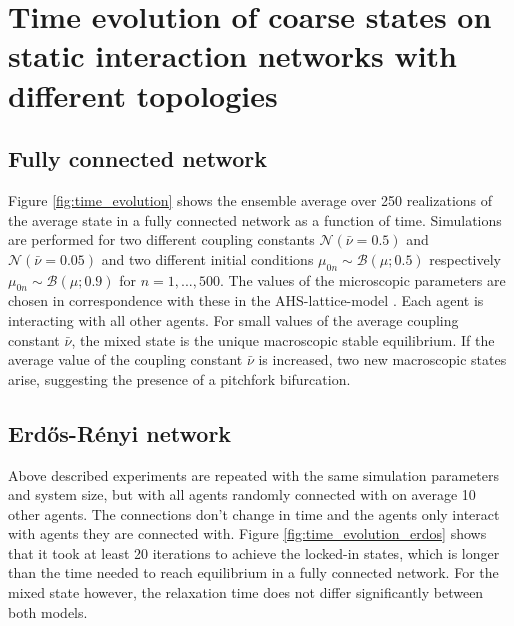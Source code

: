 \documentclass[]{article}
\title{}
\author{}
\begin{document}

\section{Time evolution of coarse states on static interaction networks with different topologies}
\subsection{Fully connected network}

Figure \ref{fig:time_evolution} shows the ensemble average over 250 realizations of the average state in a fully connected network as a function of time. Simulations are performed for two different coupling constants $\mathcal{N}(\bar{\nu}=0.5)$ and  $\mathcal{N}(\bar{\nu}=0.05)$ and two different initial conditions $ \mu_{0 n} \sim \mathcal{B} ( \mu; 0.5) $ respectively $ \mu_{0n} \sim\mathcal{B} ( \mu; 0.9 ) $ for $n=1,...,500$.     %
 The values of the microscopic parameters are chosen in correspondence with these in the AHS-lattice-model \cite{avitabile14}. Each agent is interacting with all other agents. For small values of the average coupling constant $\bar{\nu}$, the mixed state is the unique macroscopic stable equilibrium.  If the average value of the coupling constant $\bar{\nu}$ is increased, two new macroscopic states arise, suggesting the presence of a pitchfork bifurcation. 

\subsection{Erd\H{o}s-Rényi network}

Above described experiments are repeated with the same simulation parameters and system size, but with all agents randomly connected with on average 10 other agents. The connections don't change in time and the agents only interact with agents they are connected with. Figure \ref{fig:time_evolution_erdos} shows that it took at least 20 iterations to achieve the locked-in states, which is longer than the time needed to reach equilibrium in a fully connected network. For the mixed state however, the relaxation time does not differ significantly between both models.
\end{document}
